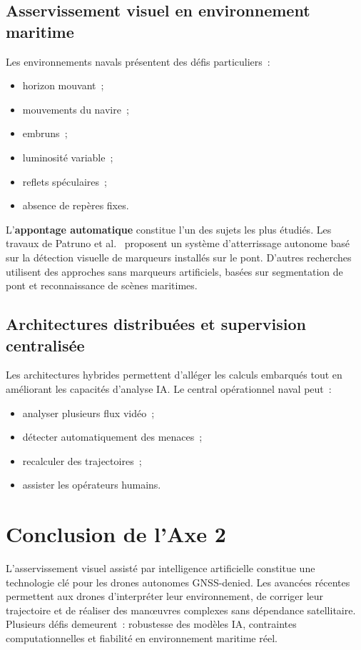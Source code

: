 \documentclass[12pt, a4paper, twoside, openright]{report}
\begin{document}
\subsection{Asservissement visuel en environnement maritime}

Les environnements navals présentent des défis particuliers~:

\begin{itemize}
    \item horizon mouvant~;
    \item mouvements du navire~;
    \item embruns~;
    \item luminosité variable~;
    \item reflets spéculaires~;
    \item absence de repères fixes.
\end{itemize}

L'\textbf{appontage automatique} constitue l'un des sujets les plus étudiés. Les travaux de Patruno et al.~\cite{patruno2021visual} proposent un système d'atterrissage autonome basé sur la détection visuelle de marqueurs installés sur le pont. D'autres recherches utilisent des approches sans marqueurs artificiels, basées sur segmentation de pont et reconnaissance de scènes maritimes.

\subsection{Architectures distribuées et supervision centralisée}

Les architectures hybrides permettent d'alléger les calculs embarqués tout en améliorant les capacités d'analyse IA. Le central opérationnel naval peut~:

\begin{itemize}
    \item analyser plusieurs flux vidéo~;
    \item détecter automatiquement des menaces~;
    \item recalculer des trajectoires~;
    \item assister les opérateurs humains.
\end{itemize}

\section{Conclusion de l'Axe 2}

L'asservissement visuel assisté par intelligence artificielle constitue une technologie clé pour les drones autonomes GNSS-denied. Les avancées récentes permettent aux drones d'interpréter leur environnement, de corriger leur trajectoire et de réaliser des manœuvres complexes sans dépendance satellitaire. Plusieurs défis demeurent~: robustesse des modèles IA, contraintes computationnelles et fiabilité en environnement maritime réel.
\end{document}
